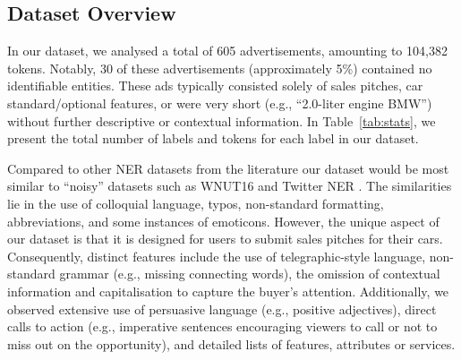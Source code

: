 \documentclass[11pt]{article}
\begin{document}
\subsection{Dataset Overview}
\label{sec:data_attrs}

In our dataset, we analysed a total of 605 advertisements, amounting to 104,382 tokens. Notably, 30 of these advertisements (approximately 5\%) contained no identifiable entities. These ads typically consisted solely of sales pitches, car standard/optional features, or were very short (e.g., ``2.0-liter engine BMW'') without further descriptive or contextual information. In Table~\ref{tab:stats}, we present the total number of labels and tokens for each label in our dataset.

\begin{table}[t]
\centering

\caption{Distribution of labels and their corresponding tokens in our dataset.}
\label{tab:stats}
\end{table}


Compared to other NER datasets from the literature our dataset would be most similar to ``noisy'' datasets such as WNUT16 \citep{strauss-etal-2016-results} and Twitter NER \citep{ritter-etal-2011-named}. The similarities lie in the use of colloquial language, typos, non-standard formatting, abbreviations, and some instances of emoticons. However, the unique aspect of our dataset is that it is designed for users to submit sales pitches for their cars. Consequently, distinct features include the use of telegraphic-style language, non-standard grammar (e.g., missing connecting words), the omission of contextual information and capitalisation to capture the buyer's attention. Additionally, we observed extensive use of persuasive language (e.g., positive adjectives), direct calls to action (e.g., imperative sentences encouraging viewers to call or not to miss out on the opportunity), and detailed lists of features, attributes or services.
\end{document}
